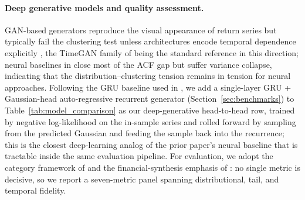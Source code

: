 \paragraph{Deep generative models and quality assessment.}
GAN-based generators reproduce the visual appearance of return series but typically fail the clustering test unless architectures encode temporal dependence explicitly \cite{takahashi2019modeling, kwon2024can}, the TimeGAN family of \citet{yoon2019timegan} being the standard reference in this direction; neural baselines in \citet{alswaidan2026hybrid} close most of the ACF gap but suffer variance collapse, indicating that the distribution--clustering tension remains in tension for neural approaches.
Following the GRU baseline used in \citet{alswaidan2026hybrid}, we add a single-layer GRU + Gaussian-head auto-regressive recurrent generator (Section~\ref{sec:benchmarks}) to Table~\ref{tab:model_comparison} as our deep-generative head-to-head row, trained by negative log-likelihood on the in-sample series and rolled forward by sampling from the predicted Gaussian and feeding the sample back into the recurrence; this is the closest deep-learning analog of the prior paper's neural baseline that is tractable inside the same evaluation pipeline.
For evaluation, we adopt the category framework of \citet{stenger2024thinking} and the financial-synthesis emphasis of \citet{assefa2020generating}: no single metric is decisive, so we report a seven-metric panel spanning distributional, tail, and temporal fidelity.
